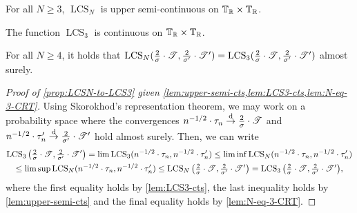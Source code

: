 \documentclass[11pt,reqno]{amsart}
\newcommand{\LCS}{\operatorname{LCS}}
\begin{document}
\begin{lem}\label{lem:upper-semi-cts}
    For all $N\geq 3$, $\LCS_N$ is upper semi-continuous on $\mathbb{T}_{\mathbb{R}}\times\mathbb{T}_{\mathbb{R}}$.
\end{lem}
\begin{lem}\label{lem:LCS3-cts}
The function $\LCS_3$ is continuous on $\mathbb{T}_{\mathbb{R}}\times\mathbb{T}_{\mathbb{R}}$.
\end{lem}
\begin{lem}\label{lem:N-eq-3-CRT} 
For all $N\geq 4$, it holds that $\LCS_N(\frac{2}{\sigma}\cdot\sT,\frac{2}{\sigma'}\cdot\sT')=\LCS_3(\frac{2}{\sigma}\cdot\sT,\frac{2}{\sigma'}\cdot\sT')$ almost surely.
\end{lem}




\begin{proof}[Proof of \cref{prop:LCSN-to-LCS3} given \cref{lem:upper-semi-cts,lem:LCS3-cts,lem:N-eq-3-CRT}] Using Skorokhod's representation theorem, we may work on a probability space where the convergences $n^{-1/2}\cdot\tau_n \stackrel{\mathrm{d}}{\rightarrow} \frac{2}{\sigma}\cdot\mathscr{T}$ and $n^{-1/2}\cdot\tau_n' \stackrel{\mathrm{d}}{\rightarrow} \frac{2}{\sigma'}\cdot\mathscr{T}'$ hold almost surely. Then, we can write
\begin{multline*}
\LCS_3\big(\tfrac{2}{\sigma}\cdot\sT,\tfrac{2}{\sigma'}\cdot\sT'\big)=\lim \LCS_3(n^{-1/2}\cdot\tau_n,n^{-1/2}\cdot\tau_n')\leq \liminf \LCS_N(n^{-1/2}\cdot\tau_n,n^{-1/2}\cdot\tau_n')\\
\leq \limsup \LCS_N(n^{-1/2}\cdot\tau_n,n^{-1/2}\cdot\tau_n')\leq \LCS_N\big(\tfrac{2}{\sigma}\cdot\sT,\tfrac{2}{\sigma'}\cdot\sT'\big)=\LCS_3\big(\tfrac{2}{\sigma}\cdot\sT,\tfrac{2}{\sigma'}\cdot\sT'\big),
\end{multline*}
where the first equality holds by \cref{lem:LCS3-cts}, the last inequality holds by \cref{lem:upper-semi-cts} and the final equality holds by \cref{lem:N-eq-3-CRT}.
\end{proof}
\end{document}
